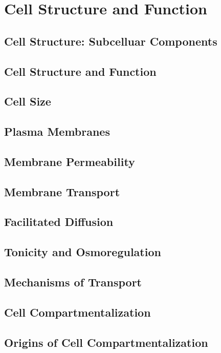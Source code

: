 \documentclass[../bio.tex]{subfiles}
\begin{document}
\chapter{Cell Structure and Function}
\section{Cell Structure: Subcelluar Components}
\section{Cell Structure and Function}
\section{Cell Size}
\section{Plasma Membranes}
\section{Membrane Permeability}
\section{Membrane Transport}
\section{Facilitated Diffusion}
\section{Tonicity and Osmoregulation}
\section{Mechanisms of Transport}
\section{Cell Compartmentalization}
\section{Origins of Cell Compartmentalization}
\end{document}
